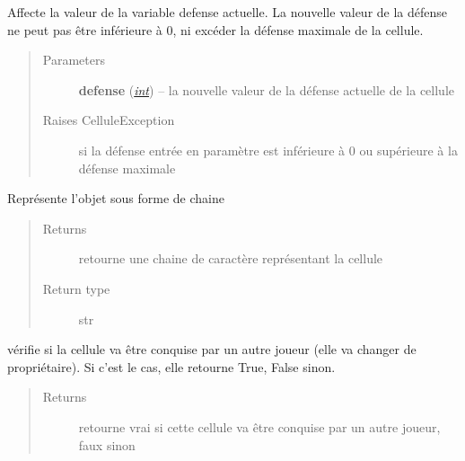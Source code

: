\documentclass[letterpaper,10pt,english]{sphinxmanual}
\begin{document}
\begin{fulllineitems}
\begin{fulllineitems}
\begin{quote}
\begin{description}
\end{description}\end{quote}

\end{fulllineitems}


\begin{fulllineitems}
\label{index:Cellule.Cellule.setDefense}
Affecte la valeur de la variable defense actuelle.
La nouvelle valeur de la défense ne peut pas être inférieure à 0, ni excéder la défense maximale de la cellule.
\begin{quote}\begin{description}
\item[{Parameters}] \leavevmode
\textbf{defense} (\href{http://docs.python.org/library/functions.html\#int}{\emph{int}}) -- la nouvelle valeur de la défense actuelle de la cellule

\item[{Raises CelluleException}] \leavevmode
si la défense entrée en paramètre est inférieure à 0 ou supérieure à la défense maximale

\end{description}\end{quote}

\end{fulllineitems}


\begin{fulllineitems}
\label{index:Cellule.Cellule.toString}
Représente l'objet sous forme de chaine
\begin{quote}\begin{description}
\item[{Returns}] \leavevmode
retourne une chaine de caractère représentant la cellule

\item[{Return type}] \leavevmode
str

\end{description}\end{quote}

\end{fulllineitems}


\begin{fulllineitems}
\label{index:Cellule.Cellule.vaEtrePrise}
vérifie si la cellule va être conquise par un autre joueur (elle va changer de propriétaire).
Si c'est le cas, elle retourne True, False sinon.
\begin{quote}\begin{description}
\item[{Returns}] \leavevmode
retourne vrai si cette cellule va être conquise par un autre joueur, faux sinon


\end{description}
\end{quote}
\end{fulllineitems}
\end{fulllineitems}
\end{document}
